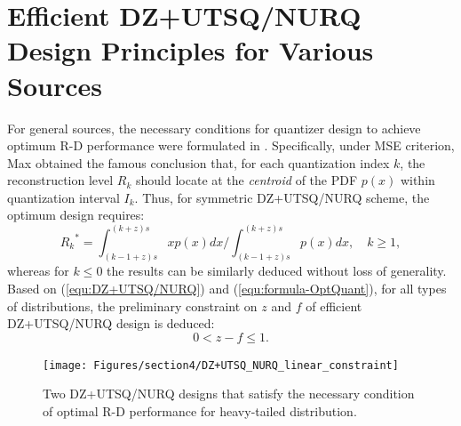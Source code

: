 \documentclass[smallabstract,smallcaptions]{dccpaper}
\begin{document}


\section{Efficient DZ+UTSQ/NURQ Design Principles for Various Sources}

For general sources, the necessary conditions for quantizer design to achieve optimum R-D performance were formulated in \cite{Farvardin_TIT1984}. Specifically, under MSE criterion, Max \cite{Max_TIT1960} obtained the famous conclusion that, for each quantization index $k$, the reconstruction level $R_k$ should locate at the \emph{centroid} of the PDF $p(x)$ within quantization interval $I_k$. Thus, for symmetric DZ+UTSQ/NURQ scheme, the optimum design requires:
\begin{equation}\label{equ:formula-OptQuant}
	{R_k}^* = \int_{(k-1+z)s}^{(k+z)s} xp(x)dx / \int_{(k-1+z)s}^{(k+z)s} p(x)dx, \quad k \ge 1,
\end{equation}
whereas for $k \le 0$ the results can be similarly deduced without loss of generality. Based on (\ref{equ:DZ+UTSQ/NURQ}) and (\ref{equ:formula-OptQuant}), for all types of distributions, the preliminary constraint on $z$ and $f$ of efficient DZ+UTSQ/NURQ design is deduced: 
\begin{equation}\label{equ:formula-PreConstraint}
	 0 < z - f \le 1. 
\end{equation}

\begin{figure}[tp]
\centering
\texttt{[image: Figures/section4/DZ+UTSQ\_NURQ\_linear\_constraint]}\\
\caption{\label{fig:linear_constraint}
Two DZ+UTSQ/NURQ designs that satisfy the necessary condition of optimal R-D performance for heavy-tailed distribution.}
\end{figure}
\end{document}
